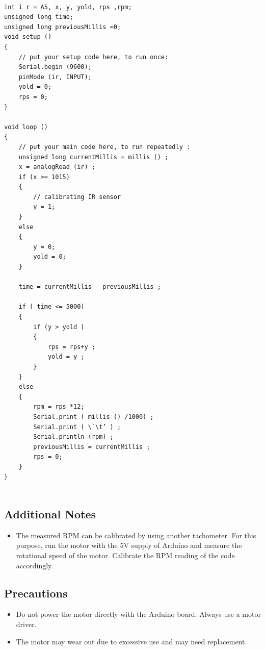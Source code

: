 \begin{lstlisting}[language=Arduino, numbers=none, caption={Arduino code for measuring the speed of a moving object},captionpos=b, label={lst:rot}]

int i r = A5, x, y, yold, rps ,rpm;
unsigned long time;
unsigned long previousMillis =0;
void setup () 
{
    // put your setup code here, to run once:
    Serial.begin (9600);
    pinMode (ir, INPUT);
    yold = 0;
    rps = 0;
}

void loop ()
{
    // put your main code here, to run repeatedly :
    unsigned long currentMillis = millis () ;
    x = analogRead (ir) ;
    if (x >= 1015)
    { 
        // calibrating IR sensor
        y = 1;
    }
    else
    {
        y = 0;
        yold = 0;
    }

    time = currentMillis - previousMillis ;
    
    if ( time <= 5000)
    {
        if (y > yold )
        {
            rps = rps+y ;
            yold = y ;
        }
    }
    else
    {
        rpm = rps *12;
        Serial.print ( millis () /1000) ;
        Serial.print ( \`\t’ ) ;
        Serial.println (rpm) ;
        previousMillis = currentMillis ;
        rps = 0;
    }
}


\end{lstlisting}

\subsection*{Additional Notes}
\begin{itemize}[noitemsep, leftmargin=*]
    \item The measured RPM can be calibrated by using another tachometer. For this purpose, run the motor with the 5V supply of Arduino and measure the rotational speed of the motor. Calibrate the RPM reading of the code accordingly.
\end{itemize}

\subsection*{Precautions}
\begin{itemize}[noitemsep, leftmargin=*]
    \item Do not power the motor directly with the Arduino board. Always use a motor driver.
    \item The motor may wear out due to excessive use and may need replacement. 
\end{itemize}

